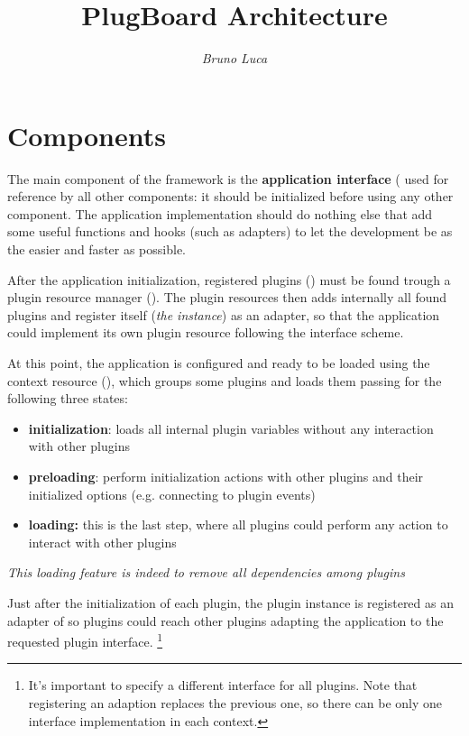 \documentclass[12pt,a4paper]{report}
\begin{document}
\title{PlugBoard Architecture}
\author{\emph{Bruno Luca}}

\maketitle

\chapter{Components}

The main component of the framework is the \textbf{application interface}
( used for reference by all other components:
it should be initialized before using any other component. The application
implementation should do nothing else that add some useful functions
and hooks (such as adapters) to let the development be as the easier
and faster as possible.

After the application initialization, registered plugins ()
must be found trough a plugin resource manager ().
The plugin resources then adds internally all found plugins and register
itself (\emph{the instance}) as an  adapter,
so that the application could implement its own plugin resource following
the interface scheme.

At this point, the application is configured and ready to be loaded
using the context resource (), which groups
some plugins and loads them passing for the following three states:

\begin{itemize}
\item \textbf{initialization}: loads all internal plugin variables without
any interaction with other plugins
\item \textbf{preloading}: perform initialization actions with other plugins
and their initialized options (e.g. connecting to plugin events)
\item \textbf{loading:} this is the last step, where all plugins could perform
any action to interact with other plugins
\end{itemize}
\emph{This loading feature is indeed to remove all dependencies among
plugins}

Just after the initialization of each plugin, the plugin instance
is registered as an adapter of  so plugins could
reach other plugins adapting the application to the requested plugin
interface.%
\footnote{It's important to specify a different interface for all plugins. Note
that registering an adaption replaces the previous one, so there can
be only one interface implementation in each context.%
}
\end{document}
